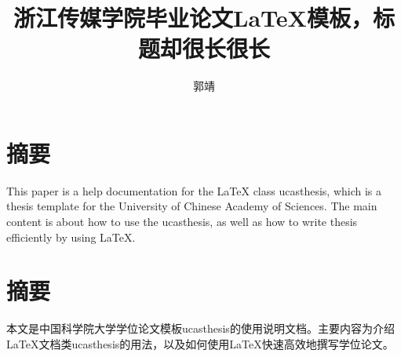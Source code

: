 \confidential{}%
\title{浙江传媒学院毕业论文\LaTeX{}模板，标题却很长很长}%
\author{郭靖}%
\maketitle%
\makedeclaration%
\nofootermatter
\chapter*{摘要}%

This paper is a help documentation for the \LaTeX{} class ucasthesis, which is  a thesis template for the University of Chinese Academy of Sciences. The main content is about how to use the ucasthesis, as well as how to write thesis efficiently by using \LaTeX{}.

\chapter*{摘要}%

本文是中国科学院大学学位论文模板ucasthesis的使用说明文档。主要内容为介绍\LaTeX{}文档类ucasthesis的用法，以及如何使用\LaTeX{}快速高效地撰写学位论文。

